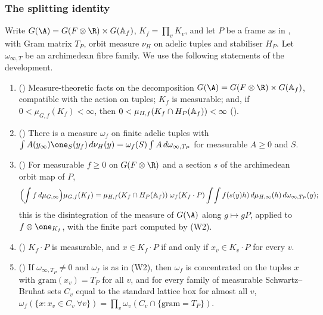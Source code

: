 \subsubsection*{The splitting identity}

Write $G(\A)=G(F\otimes\R)\times G(\multncAf)$, $K_f=\prod_vK_v$, and let $P$ be a frame as in , with Gram
matrix $T_P$, orbit measure $\nu_H$ on adelic tuples and stabiliser $H_P$. Let $\omega_{\infty,T}$ be an archimedean fibre
family. We use the following statements of the development.
\begin{enumerate}[label=(W\arabic*)]
\item () Measure-theoretic facts on the decomposition
$G(\A)=G(F\otimes\R)\times G(\multncAf)$, compatible with the action on tuples; $K_f$ is measurable; and, if
$0<\mu_{G,f}(K_f)<\infty$, then $0<\mu_{H,f}(K_f\cap H_P(\mathbb{A}_{f}))<\infty$ ().
\item () There is a measure $\omega_f$ on finite
adelic tuples with $\int A(y_\infty)\one_S(y_f)\,d\nu_H(y)=\omega_f(S)\int A\,d\omega_{\infty,T_P}$ for measurable $A\ge0$ and
$S$.
\item () For measurable $f\ge0$ on $G(F\otimes\R)$ and a section
$s$ of the archimedean orbit map of $P$,
\[
\Bigl(\int f\,d\mu_{G,\infty}\Bigr)\mu_{G,f}(K_f)=\mu_{H,f}(K_f\cap H_P(\mathbb{A}_{f}))\;\omega_f(K_f\cdot P)\int\!\int
f(s(y)h)\,d\mu_{H,\infty}(h)\,d\omega_{\infty,T_P}(y);
\]
this is the disintegration of the measure of $G(\A)$ along $g\mapsto gP$, applied to $f\otimes\one_{K_f}$, with the finite
part computed by (W2).
\item () $K_f\cdot P$ is measurable, and $x\in K_f\cdot P$ if and
only if $x_v\in K_v\cdot P$ for every $v$.
\item () If $\omega_{\infty,T_P}\ne0$ and $\omega_f$ is as in (W2),
then $\omega_f$ is concentrated on the tuples $x$ with $\mathrm{gram}(x_v)=T_P$ for all $v$, and for every family of
measurable Schwartz--Bruhat sets $C_v$ equal to the standard lattice box for almost all $v$,
$\omega_f(\{x:x_v\in C_v\ \forall v\})=\prod_v\omega_v(C_v\cap\{\mathrm{gram}=T_P\})$.
\end{enumerate}

